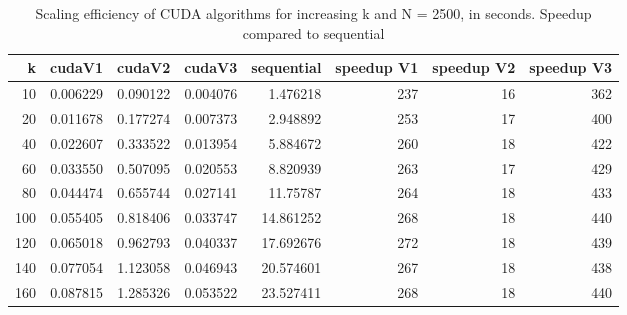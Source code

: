 \documentclass[11pt]{article}
\begin{document}
\begin{table}[htbp]
\caption{Scaling efficiency of CUDA algorithms for increasing k and N = 2500, in seconds. Speedup compared to sequential}
\centering
\begin{tabular}{rrrrrrrr}
\hline
k & cudaV1 & cudaV2 & cudaV3 & sequential & speedup V1 & speedup V2 & speedup V3\\[0pt]
\hline
10 & 0.006229 & 0.090122 & 0.004076 & 1.476218 & 237 & 16 & 362\\[0pt]
20 & 0.011678 & 0.177274 & 0.007373 & 2.948892 & 253 & 17 & 400\\[0pt]
40 & 0.022607 & 0.333522 & 0.013954 & 5.884672 & 260 & 18 & 422\\[0pt]
60 & 0.033550 & 0.507095 & 0.020553 & 8.820939 & 263 & 17 & 429\\[0pt]
80 & 0.044474 & 0.655744 & 0.027141 & 11.75787 & 264 & 18 & 433\\[0pt]
100 & 0.055405 & 0.818406 & 0.033747 & 14.861252 & 268 & 18 & 440\\[0pt]
120 & 0.065018 & 0.962793 & 0.040337 & 17.692676 & 272 & 18 & 439\\[0pt]
140 & 0.077054 & 1.123058 & 0.046943 & 20.574601 & 267 & 18 & 438\\[0pt]
160 & 0.087815 & 1.285326 & 0.053522 & 23.527411 & 268 & 18 & 440\\[0pt]
\hline
\end{tabular}
\end{table}

\printbibliography[heading=bibnumbered]
\end{document}
